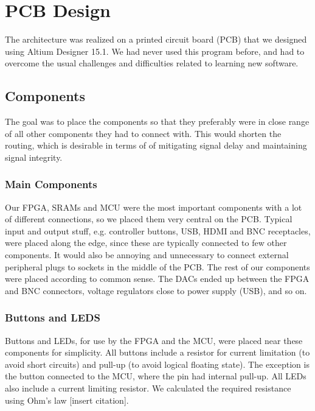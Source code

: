 \section{PCB Design}
The architecture was realized on a printed circuit board (PCB) that we designed using Altium Designer 15.1. We had never used this program before, and had to overcome the usual challenges and difficulties related to learning new software.

\subsection{Components}
The goal was to place the components so that they preferably were in close range of all other components they had to connect with. This would shorten the routing, which is desirable in terms of of mitigating signal delay and maintaining signal integrity.
\subsubsection{Main Components}
Our FPGA, SRAMs and MCU were the most important components with a lot of different connections, so we placed them very central on the PCB. Typical input and output stuff, e.g. controller buttons, USB, HDMI and BNC receptacles, were placed along the edge, since these are typically connected to few other components. It would also be annoying and unnecessary to connect external peripheral plugs to sockets in the middle of the PCB. 
\newline
The rest of our components were placed according to common sense. The DACs ended up between the FPGA and BNC connectors, voltage regulators close to power supply (USB), and so on. 
\subsubsection{Buttons and LEDS}
Buttons and LEDs, for use by the FPGA and the MCU, were placed near these components for simplicity. All buttons include a resistor for current limitation (to avoid short circuits) and pull-up (to avoid logical floating state). The exception is the button connected to the MCU, where the pin had internal pull-up. All LEDs also include a current limiting resistor. We calculated the required resistance using Ohm's law [insert citation].

